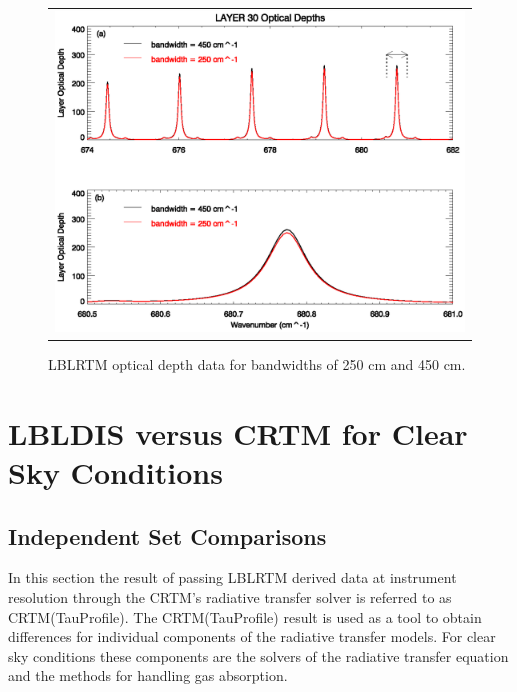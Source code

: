 \begin{figure}[htp]
  \centering{}
  \begin{tabular}{c}    
    \includegraphics[bb=97 227 534 568,clip,scale=0.8]{./graphics/Optical_Depth_CO2_30.eps}
  \end{tabular}
  \caption{LBLRTM optical depth data for bandwidths of 250 cm and 450 cm.}
  \label{fig:Optical_Depth_Broad_CO2}
\end{figure}

\newpage{}

\section{LBLDIS versus CRTM for Clear Sky Conditions}

\subsection{Independent Set Comparisons}

In this section the result of passing LBLRTM derived data at instrument resolution through the CRTM's radiative transfer solver is referred to as CRTM(TauProfile). The CRTM(TauProfile) result is used as a tool to obtain differences for individual components of the radiative transfer models. For clear sky conditions these components
are the solvers of the radiative transfer equation and the methods for handling gas absorption. 

